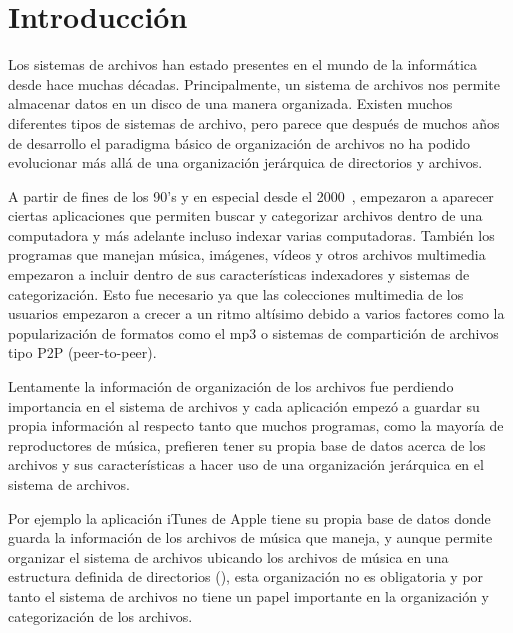 \chapter{Introducción}
\ifpdf
    \graphicspath{{Introduction/IntroductionFigs/PNG/}{Introduction/IntroductionFigs/PDF/}{Introduction/IntroductionFigs/}}
\else
    \graphicspath{{Introduction/IntroductionFigs/EPS/}{Introduction/IntroductionFigs/}}
\fi

Los sistemas de archivos han estado presentes en el mundo de la informática desde hace muchas décadas. Principalmente, un sistema de archivos nos permite almacenar datos en un disco de una manera organizada. Existen muchos diferentes tipos de sistemas de archivo, pero parece que después de muchos años de desarrollo el paradigma básico de organización de archivos no ha podido evolucionar más allá de una organización jerárquica de directorios y archivos.

A partir de fines de los 90's y en especial desde el 2000~\cite{history:website}, empezaron a aparecer ciertas aplicaciones que permiten buscar y categorizar archivos dentro de una computadora y más adelante incluso indexar varias computadoras. También los programas que manejan música, imágenes, vídeos y otros archivos multimedia empezaron a incluir dentro de sus características indexadores y sistemas de categorización. Esto fue necesario ya que las colecciones multimedia de los usuarios empezaron a crecer a un ritmo altísimo debido a varios factores como la popularización de formatos como el mp3 o sistemas de compartición de archivos tipo P2P (peer-to-peer).

Lentamente la información de organización de los archivos fue perdiendo importancia en el sistema de archivos y cada aplicación empezó a guardar su propia información al respecto tanto que muchos programas, como la mayoría de reproductores de música, prefieren tener su propia base de datos acerca de los archivos y sus características a hacer uso de una organización jerárquica en el sistema de archivos.

Por ejemplo la aplicación iTunes de Apple tiene su propia base de datos donde guarda la información de los archivos de música que maneja, y aunque permite organizar el sistema de archivos ubicando los archivos de música en una estructura definida de directorios (), esta organización no es obligatoria y por tanto el sistema de archivos no tiene un papel importante en la organización y categorización de los archivos.

